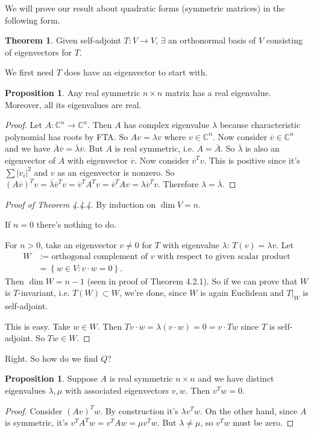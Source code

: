\documentclass[a4paper]{article}
\theoremstyle{definition}
\newtheorem{prop}[defn]{Proposition}
\newtheorem{thm}[defn]{Theorem}
\begin{document}
We will prove our result about quadratic forms (symmetric matrices) in the following form.

\begin{thm}
Given self-adjoint $T:V\rightarrow V$, $\exists$ an orthonormal basis of $V$ consisting of eigenvectors for $T$.
\end{thm}
We first need $T$ does have an eigenvector to start with.
\begin{prop}
Any real symmetric $n\times n$ matrix has a real eigenvalue. Moreover, all its eigenvalues are real.
\end{prop}
\begin{proof}
Let $A:\mathbb C^n \rightarrow \mathbb C^n$. Then $A$ has complex eigenvalue $\lambda$ because characteristic polynomial has roots by FTA. So $Av=\lambda v$ where $v\in \mathbb C^n$. Now consider $\overline{v}\in \mathbb C^n$ and we have $\overline{A}\overline{v}=\overline{\lambda}\overline{v}$. But $A$ is real symmetric, i.e. $A=\overline{A}.$ So $\overline{\lambda}$ is also an eigenvector of $A$ with eigenvector $\overline{v}$. Now consider $\overline{v}^Tv$. This is positive since it's $\sum |v_i|^2$ and $v$ as an eigenvector is nonzero. So $(A\overline{v})^Tv = \overline{\lambda}\overline{v}^Tv = \overline{v}^TA^Tv = \overline{v}^TAv = \lambda \overline{v}^Tv$. Therefore $\lambda=\overline{\lambda}$.
\end{proof}
\begin{proof}[Proof of Theorem 4.4.4]
By induction on $\dim V=n$.

If $n=0$ there's nothing to do.

For $n>0$, take an eigenvector $v\neq 0$ for $T$ with eigenvalue $\lambda$: $T(v)=\lambda v$. Let
\[
\begin{aligned}
W &:=\text{orthogonal complement of }v\text{ with respect to given scalar product}\\&= \left\{ w\in V:v\cdot w=0 \right\}.
\end{aligned}
\]
Then $\dim W=n-1$ (seen in proof of Theorem 4.2.1). So if we can prove that $W$ is $T$-invariant, i.e. $T(W)\subset W$, we're done, since $W$ is again Euclidean and $\left. T \right|_W$ is self-adjoint.

This is easy. Take $w\in W$. Then $Tv \cdot w = \lambda (v\cdot w)=0=v\cdot Tw$ since $T$ is self-adjoint. So $Tw\in W$.
\end{proof}

Right. So how do we find $Q$?

\begin{prop}
Suppose $A$ is real symmetric $n\times n$ and we have distinct eigenvalues $\lambda,\mu$ with associated eigenvectors $v,w$. Then $v^Tw=0$.
\end{prop}
\begin{proof}
Consider $(Av)^Tw$. By construction it's $\lambda v^Tw$. On the other hand, since $A$ is symmetric, it's $v^TA^Tw = v^T Aw = \mu v^Tw$. But $\lambda \neq \mu$, so $v^Tw$ must be zero.
\end{proof}
\end{document}
